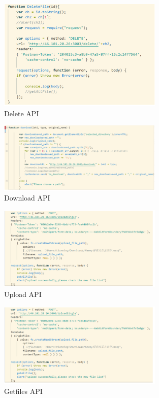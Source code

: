 \documentclass[11pt]{article}
\begin{document}
\begin{figure} [H]
\caption{Delete API}
\centering
\includegraphics[width=0.7\textwidth]{ADelete.PNG}
\end{figure}

\begin{figure} [H]
\caption{Download API}
\centering
\includegraphics[width=0.7\textwidth]{ADownload.PNG}
\end{figure}

\begin{figure} [H]
\caption{Upload API}
\centering
\includegraphics[width=0.7\textwidth]{AUpload.PNG}
\end{figure}

\begin{figure} [H]
\caption{Getfiles API}
\centering
\includegraphics[width=0.7\textwidth]{AUpload.PNG}
\end{figure}
\end{document}
